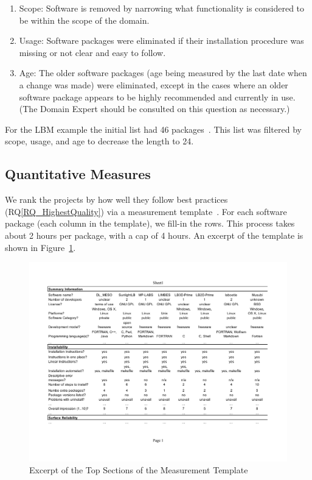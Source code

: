 \documentclass[runningheads]{llncs}
\newcommand{\rqref}[1]{RQ\ref{#1}}
\begin{document}
\begin{enumerate}
	\item Scope: Software is removed by narrowing what functionality is
	considered to be within the scope of the domain.
	\item Usage: Software packages were eliminated if their installation
	procedure was missing or not clear and easy to follow.
	\item Age: The older software packages (age being measured by the last date
	when a change was made) were eliminated, except in the cases where an older
	software package appears to be highly recommended and currently in use. (The
	Domain Expert should be consulted on this question as necessary.)
\end{enumerate}

For the LBM example the initial list had 46 packages~\cite{Michalski2021}. This
list was filtered by scope, usage, and age to decrease the length to 24.

\subsection{Quantitative Measures} \label{empiricalmeasures}

We rank the projects by how well they follow best practices
(\rqref{RQ_HighestQuality}) via a measurement template~\cite{SmithEtAl2021}. For
each software package (each column in the template), we fill-in the rows. This
process takes about 2 hours per package, with a cap of 4 hours.  An excerpt of
the template is shown in Figure~\ref{measurement_template_image}.

\begin{figure}[!ht]
	\begin{center}
	  \includegraphics[width=1.0\textwidth]{./figures/measurement_template.pdf}
	  \caption{Excerpt of the Top Sections of the Measurement Template}
	  \label{measurement_template_image}
	\end{center}
\end{figure}
\end{document}
